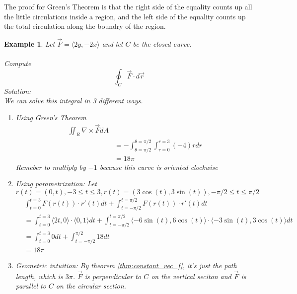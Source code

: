\documentclass[11pt]{article}
\newtheorem{ex}{Example}
\begin{document}
The proof for Green's Theorem is that the right side of the equality counts up all the little circulations inside a region, and the
left side of the equality counts up the total circulation along the boundry of the region.
\begin{ex}
  Let $\vec{F} = \langle 2y, -2x \rangle$ and let $C$ be the closed curve.\\
  \\
  Compute
  \[\oint_{C} \vec{F} \cdot d \vec{r}\]
  Solution: \\
  We can solve this integral in 3 different ways.
  \begin{enumerate}
  \item Using Green's Theorem
\begin{align*}
  \iint_{R} \nabla \times \vec{F} dA\\
  &= -\int_{\theta = \pi/2}^{\theta=\pi/2} \int_{r=0}^{r=3} (-4) r dr \\
  &= 18\pi
\end{align*}
Remeber to multiply by $-1$ because this curve is oriented clockwise

\item Using parametrization:
Let
\[r(t) = (0, t), -3 \le t \le 3, r(t) = (3\cos(t), 3\sin(t)), -\pi/2 \le t \le \pi/2\]
\begin{align*}
  &\int_{t=0}^{t=3} F(r(t)) \cdot r'(t) dt + \int_{t=-\pi/2}^{t=\pi/2} F(r(t)) \cdot r'(t) dt \\
  &= \int_{t=0}^{t=3} \langle 2t, 0 \rangle \cdot \langle 0, 1 \rangle dt + \int_{t=-\pi/2}^{t=\pi/2} \langle -6\sin(t) , 6\cos(t) \rangle \cdot \langle -3\sin(t), 3\cos(t) \rangle  dt \\
  &= \int_{t=0}^{t=3} 0 dt + \int_{t=-\pi/2}^{\pi/2} 18 dt \\
  &= 18\pi
\end{align*}
\item Geometric intuition:
By theorem \ref{thm:constant_vec_f}, it's just the path length, which is $3\pi$. $\vec{F}$ is perpendicular to $C$ on the vertical
seciton and $\vec{F}$ is parallel to $C$ on the circular section.
          \end{enumerate}
\end{ex}
\end{document}
